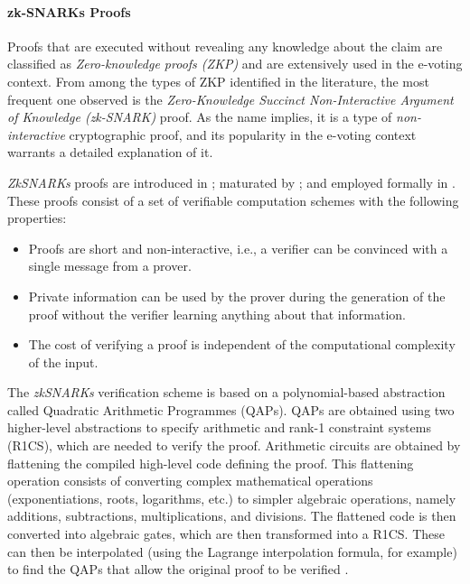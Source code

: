 \documentclass[../access.tex]{subfiles}
\begin{document}
            \paragraph{zk-SNARKs Proofs}
                Proofs that are executed without revealing any knowledge about the claim are classified as \textit{Zero-knowledge proofs (ZKP)} and are extensively used in the e-voting context. From among the types of ZKP identified in the literature, the most frequent one observed is the \textit{Zero-Knowledge Succinct Non-Interactive Argument of Knowledge (zk-SNARK)} proof. As the name implies, it is a type of \textit{non-interactive} cryptographic proof, and its popularity in the e-voting context warrants a detailed explanation of it.
                \par
                \textit{ZkSNARKs} proofs are introduced in \cite{Gennaro2013}; maturated by \cite{Parno2016}; and employed formally in \cite{Ben-Sasson2014a}. These proofs consist of a set of verifiable computation schemes with the following properties:
                \begin{itemize}
                    \item{Proofs are short and non-interactive, i.e., a verifier can be convinced with a single message from a prover.}
                    \item{Private information can be used by the prover during the generation of the proof without the verifier learning anything about that information.}
                    \item{The cost of verifying a proof is independent of the computational complexity of the input.}
                \end{itemize} 
                
                The \textit{zkSNARKs} verification scheme is based on a polynomial-based abstraction called Quadratic Arithmetic Programmes (QAPs). QAPs are obtained using two higher-level abstractions to specify arithmetic and rank-1 constraint systems (R1CS), which are needed to verify the proof. Arithmetic circuits are obtained by flattening the compiled high-level code defining the proof. This flattening operation consists of converting complex mathematical operations (exponentiations, roots, logarithms, etc.) to simpler algebraic operations, namely additions, subtractions, multiplications, and divisions. The flattened code is then converted into algebraic gates, which are then transformed into a R1CS. These can then be interpolated (using the Lagrange interpolation formula, for example) to find the QAPs that allow the original proof to be verified \cite{Eberhardt2018} \cite{Maesa2023}.
\end{document}
